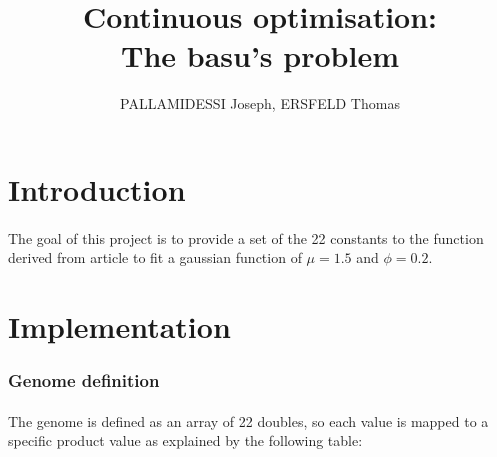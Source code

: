 \documentclass{article}
\begin{document}
  
  \title{Continuous optimisation: \\
    \large The basu's problem}
  \author{PALLAMIDESSI Joseph, ERSFELD Thomas}
  \maketitle
  
  \section{Introduction} %
  \label{sec:Intr}
    \paragraph{} %
    \label{par:}
    The goal of this project is to provide a set of the 22 constants to the
    function derived from article\cite{} to fit a gaussian function of $\mu=1.5$ and
    $\phi=0.2$.


  \section{Implementation} %
  \label{sec:Implementation}
    \subsubsection{Genome definition} %
    \label{ssub:Genome definition}
      
      \paragraph{} %
      \label{par:}
        The genome is defined as an array of 22 doubles, so each value is mapped to a
        specific product value as explained by the following table:
      \\
      \\
      \\
      \\
\end{document}
